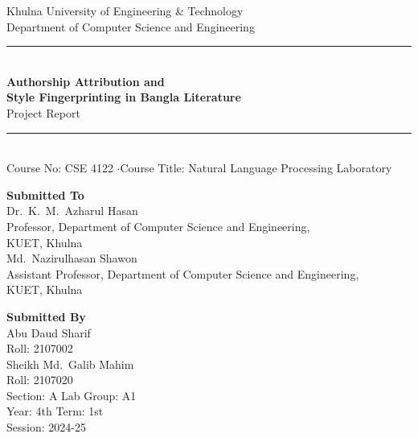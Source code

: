 \documentclass[11pt]{article}
\begin{document}
\begin{titlepage}
\centering
\vspace*{1.2cm}

{\large Khulna University of Engineering \& Technology}\\[2pt]
{\normalsize Department of Computer Science and Engineering}\\[1.6cm]

\rule{\linewidth}{0.6pt}\\[10pt]
{\LARGE\bfseries Authorship Attribution and\\[3pt] Style Fingerprinting in
Bangla Literature}\\[10pt]
{\large\color{accent} Project Report}\\[6pt]
\rule{\linewidth}{0.6pt}\\[1.4cm]

{\normalsize Course No: CSE 4122 \quad$\cdot$\quad Course Title: Natural
Language Processing Laboratory}\\[1.8cm]

\begin{minipage}[t]{0.47\linewidth}
\raggedright
\textbf{Submitted To}\\[6pt]
Dr.\ K.\ M.\ Azharul Hasan\\
{\small Professor, Department of Computer Science and Engineering,\\
KUET, Khulna}\\[10pt]
Md.\ Nazirulhasan Shawon\\
{\small Assistant Professor, Department of Computer Science and Engineering,\\
KUET, Khulna}
\end{minipage}\hfill
\begin{minipage}[t]{0.47\linewidth}
\raggedright
\textbf{Submitted By}\\[6pt]
Abu Daud Sharif\\
{\small Roll: 2107002}\\[8pt]
Sheikh Md.\ Galib Mahim\\
{\small Roll: 2107020}\\[10pt]
{\small Section: A \quad Lab Group: A1\\
Year: 4th \quad Term: 1st\\
Session: 2024-25}
\end{minipage}

\vfill

\end{titlepage}

\tableofcontents
\newpage



\end{document}
